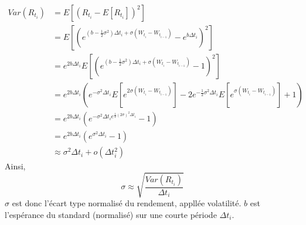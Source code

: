 \documentclass{article}
\theoremstyle{plain}
\theoremstyle{definition}
\begin{document}
\begin{equation}
\begin{split}
Var(R_{t_i})&=E[(R_{t_i}-E[R_{t_i}])^2]\\
&=E[(e^{(b-\frac{1}{2}\sigma^2)\Delta t_i+\sigma(W_{t_i}-W_{t_{i-1}})}-e^{b\Delta t_i})^2]\\
&=e^{2b\Delta t_i}E[(e^{(b-\frac{1}{2}\sigma^2)\Delta t_i+\sigma(W_{t_i}-W_{t_{i-1}})}-1)^2]\\
&=e^{2b\Delta t_i}(e^{-\sigma^2\Delta t_i}E[e^{2\sigma (W_{t_i}-W_{t_{i-1}})}]-2e^{-\frac{1}{2}\sigma^2\Delta t_i}E[e^{\sigma (W_{t_i}-W_{t_{i-1}})}]+1)\\
&=e^{2b\Delta t_i}(e^{-\sigma^2\Delta t_i e^{\frac{1}{2}(2\sigma)^2\Delta t_i}}-1)\\
&=e^{2b\Delta t_i}(e^{\sigma^2\Delta t_i}-1)\\
&\approx\sigma^2\Delta t_i+o(\Delta t_i^2)
\end{split}
\end{equation}
Ainsi,
\begin{equation}
\sigma\approx\sqrt{\frac{Var(R_{t_i})}{\Delta t_i}}
\end{equation}
$\sigma$ est donc l'\'ecart type normalis\'e du rendement, appll\'ee volatilit\'e.
$b$ est l'esp\'erance du standard (normalis\'e) sur une courte p\'eriode $\Delta t_i$.
\end{document}
